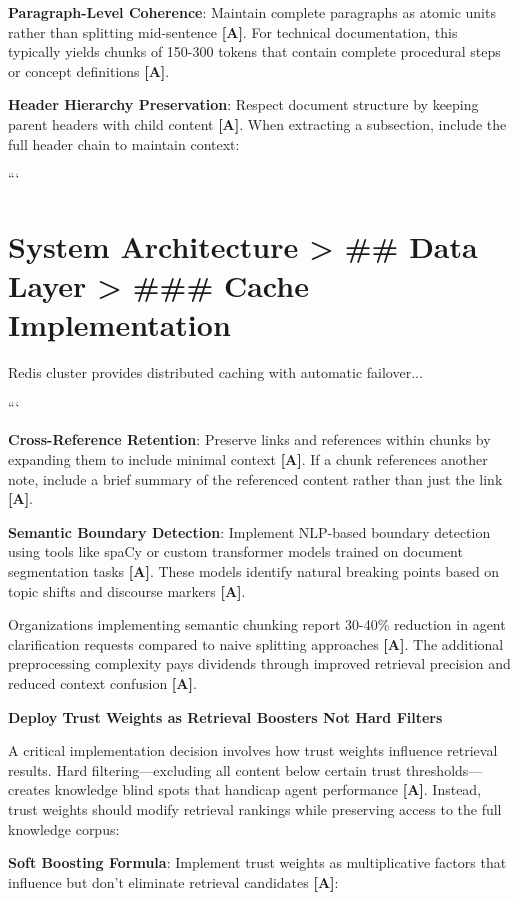 \documentclass[a4paper,11pt]{article}
\newcommand{\alabel}{\textbf{\textcolor{acolor}{[A]}}}
\begin{document}
\textbf{Paragraph-Level Coherence}: Maintain complete paragraphs as atomic units rather than splitting mid-sentence \alabel{}. For technical documentation, this typically yields chunks of 150-300 tokens that contain complete procedural steps or concept definitions \alabel{}.


\textbf{Header Hierarchy Preservation}: Respect document structure by keeping parent headers with child content \alabel{}. When extracting a subsection, include the full header chain to maintain context:


```

\section{System Architecture > \#\# Data Layer > \#\#\# Cache Implementation}
Redis cluster provides distributed caching with automatic failover...

```


\textbf{Cross-Reference Retention}: Preserve links and references within chunks by expanding them to include minimal context \alabel{}. If a chunk references another note, include a brief summary of the referenced content rather than just the link \alabel{}.


\textbf{Semantic Boundary Detection}: Implement NLP-based boundary detection using tools like spaCy or custom transformer models trained on document segmentation tasks \alabel{}. These models identify natural breaking points based on topic shifts and discourse markers \alabel{}.


Organizations implementing semantic chunking report 30-40\% reduction in agent clarification requests compared to naive splitting approaches \alabel{}. The additional preprocessing complexity pays dividends through improved retrieval precision and reduced context confusion \alabel{}.


\textbf{Deploy Trust Weights as Retrieval Boosters Not Hard Filters}\par

A critical implementation decision involves how trust weights influence retrieval results. Hard filtering—excluding all content below certain trust thresholds—creates knowledge blind spots that handicap agent performance \alabel{}. Instead, trust weights should modify retrieval rankings while preserving access to the full knowledge corpus:


\textbf{Soft Boosting Formula}: Implement trust weights as multiplicative factors that influence but don't eliminate retrieval candidates \alabel{}:
\end{document}
